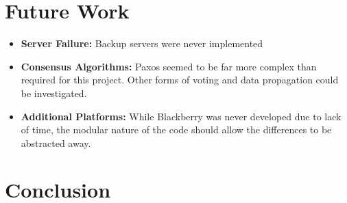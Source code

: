 \documentclass{sig-alternate}
\begin{document}
\section{Future Work}
\label{future}

\begin{itemize}
	\item \textbf{Server Failure:} Backup servers were never implemented
	\item \textbf{Consensus Algorithms:} Paxos seemed to be far more
		complex than required for this project.  Other forms of voting and
		data propagation could be investigated.
	\item \textbf{Additional Platforms:} While Blackberry was never
		developed due to lack of time, the modular nature of the code
		should allow the differences to be abstracted away.
\end{itemize}

\section{Conclusion}



\balance
\end{document}
